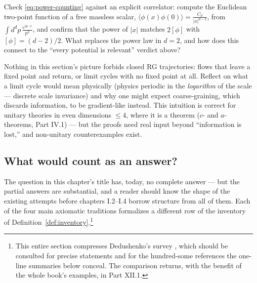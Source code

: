 \begin{exercise}[medium]
\label{exr:free-scalar-dim}
Check \eqref{eq:power-counting} against an explicit correlator: compute the
Euclidean two-point function of a free massless scalar, $\langle \phi(x) \phi(0)
\rangle = \frac{C_d}{|x|^{d-2}}$, from $\int d^dp\, \frac{e^{ip\cdot x}}{p^2}$,
and confirm that the power of $|x|$ matches $2[\phi]$ with $[\phi] = (d-2)/2$.
What replaces the power law in $d = 2$, and how does this connect to the ``every
potential is relevant'' verdict above?
\end{exercise}

\begin{exercise}[thinker]
\label{exr:irreversibility}
Nothing in this section's picture forbids closed RG trajectories: flows that
leave a fixed point and return, or limit cycles with no fixed point at all.
Reflect on what a limit cycle would mean physically (physics periodic in the
\emph{logarithm} of the scale --- discrete scale invariance) and why one might
expect coarse-graining, which discards information, to be gradient-like instead.
This intuition is correct for unitary theories in even dimensions $\le 4$, where
it is a theorem ($c$- and $a$-theorems, Part IV.1) --- but the proofs need real
input beyond ``information is lost,'' and non-unitary counterexamples exist.
\end{exercise}

\subsection{What would count as an answer?}
\label{sec:answer}

The question in this chapter's title has, today, no complete answer --- but the
partial answers are substantial, and a reader should know the shape of the
existing attempts before chapters I.2--I.4 borrow structure from all of them.
Each of the four main axiomatic traditions formalizes a different row of the
inventory of Definition~\ref{def:inventory}.\footnote{This entire section
compresses Dedushenko's survey , which should be consulted for
precise statements and for the hundred-some references the one-line summaries
below conceal. The comparison returns, with the benefit of the whole book's
examples, in Part XII.1.}


